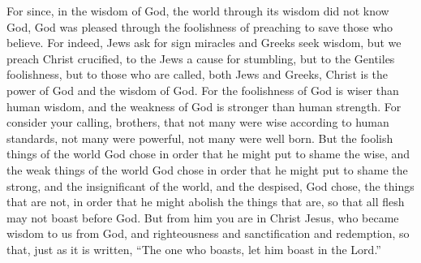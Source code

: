 \begin{biblechapter}
\verse For since, in the wisdom of God, the world through its wisdom did not know God, God was pleased through the foolishness of preaching to save those who believe.
\verse For indeed, Jews ask for sign miracles and Greeks seek wisdom,
\verse but we preach Christ crucified, to the Jews a cause for stumbling, but to the Gentiles foolishness,
\verse but to those who are called, both Jews and Greeks, Christ is the power of God and the wisdom of God.
\verse For the foolishness of God is wiser than human wisdom, and the weakness of God is stronger than human strength.
 For consider your calling, brothers, that not many were wise according to human standards, not many were powerful, not many were well born.
\verse But the foolish things of the world God chose in order that he might put to shame the wise, and the weak things of the world God chose in order that he might put to shame the strong,
\verse and the insignificant of the world, and the despised, God chose, the things that are not, in order that he might abolish the things that are,
\verse so that all flesh may not boast before God.
\verse But from him you are in Christ Jesus, who became wisdom to us from God, and righteousness and sanctification and redemption,
\verse so that, just as it is written, “The one who boasts, let him boast in the Lord.”
\end{biblechapter}

